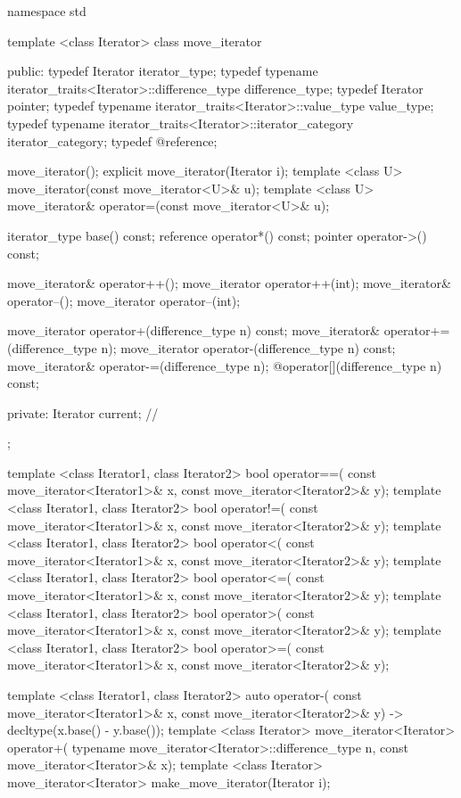 %
\begin{codeblock}
namespace std {
  template <class Iterator>
  class move_iterator {
  public:
    typedef Iterator                                              iterator_type;
    typedef typename iterator_traits<Iterator>::difference_type   difference_type;
    typedef Iterator                                              pointer;
    typedef typename iterator_traits<Iterator>::value_type        value_type;
    typedef typename iterator_traits<Iterator>::iterator_category iterator_category;
    typedef @\seebelow@                                             reference;

    move_iterator();
    explicit move_iterator(Iterator i);
    template <class U> move_iterator(const move_iterator<U>& u);
    template <class U> move_iterator& operator=(const move_iterator<U>& u);

    iterator_type base() const;
    reference operator*() const;
    pointer operator->() const;

    move_iterator& operator++();
    move_iterator operator++(int);
    move_iterator& operator--();
    move_iterator operator--(int);

    move_iterator operator+(difference_type n) const;
    move_iterator& operator+=(difference_type n);
    move_iterator operator-(difference_type n) const;
    move_iterator& operator-=(difference_type n);
    @\unspec@ operator[](difference_type n) const;

  private:
    Iterator current;   // \expos
  };

  template <class Iterator1, class Iterator2>
    bool operator==(
      const move_iterator<Iterator1>& x, const move_iterator<Iterator2>& y);
  template <class Iterator1, class Iterator2>
    bool operator!=(
      const move_iterator<Iterator1>& x, const move_iterator<Iterator2>& y);
  template <class Iterator1, class Iterator2>
    bool operator<(
      const move_iterator<Iterator1>& x, const move_iterator<Iterator2>& y);
  template <class Iterator1, class Iterator2>
    bool operator<=(
      const move_iterator<Iterator1>& x, const move_iterator<Iterator2>& y);
  template <class Iterator1, class Iterator2>
    bool operator>(
      const move_iterator<Iterator1>& x, const move_iterator<Iterator2>& y);
  template <class Iterator1, class Iterator2>
    bool operator>=(
      const move_iterator<Iterator1>& x, const move_iterator<Iterator2>& y);

  template <class Iterator1, class Iterator2>
    auto operator-(
      const move_iterator<Iterator1>& x,
      const move_iterator<Iterator2>& y) -> decltype(x.base() - y.base());
  template <class Iterator>
    move_iterator<Iterator> operator+(
      typename move_iterator<Iterator>::difference_type n, const move_iterator<Iterator>& x);
  template <class Iterator>
    move_iterator<Iterator> make_move_iterator(Iterator i);
}
\end{codeblock}

